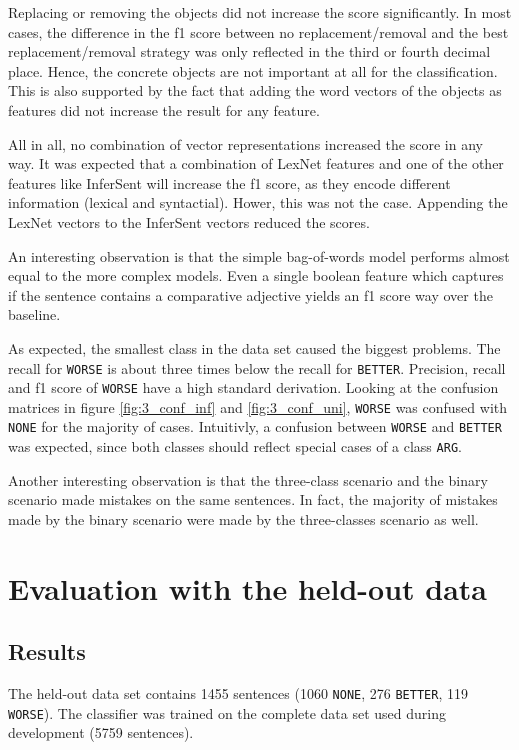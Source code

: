 Replacing or removing the objects did not increase the score significantly. In most cases, the difference in the f1 score between no replacement/removal and the best replacement/removal strategy was only reflected in the third or fourth decimal place. Hence, the concrete objects are not important at all for the classification. This is also supported by the fact that adding the word vectors of the objects as features did not increase the result for any feature.

All in all, no combination of vector representations increased the score in any way. It was expected that a combination of LexNet features and one of the other features like InferSent will increase the f1 score, as they encode different information (lexical and syntactial). Hower, this was not the case. Appending the LexNet vectors to the InferSent vectors reduced the scores.

An interesting observation is that the simple bag-of-words model performs almost equal to the more complex models. Even a single boolean feature which captures if the sentence contains a comparative adjective yields an f1 score way over the baseline.

As expected, the smallest class in the data set caused the biggest problems. The recall for \texttt{WORSE} is about three times below the recall for \texttt{BETTER}.
Precision, recall and f1 score of \texttt{WORSE} have a high standard derivation. Looking at the confusion matrices in figure \ref{fig:3_conf_inf} and \ref{fig:3_conf_uni}, \texttt{WORSE} was confused with \texttt{NONE} for the majority of cases. Intuitivly, a confusion between \texttt{WORSE} and \texttt{BETTER} was expected, since both classes should reflect special cases of a class \texttt{ARG}.

Another interesting observation is that the three-class scenario and the binary scenario made mistakes on the same sentences. In fact, the majority of mistakes made by the binary scenario were made by the three-classes scenario as well.


\section{Evaluation with the held-out data}
\subsection{Results}
\label{sec:final}

The held-out data set contains 1455 sentences (1060 \texttt{NONE}, 276 \texttt{BETTER}, 119 \texttt{WORSE}). The classifier was trained on the complete data set used during development (5759 sentences).

